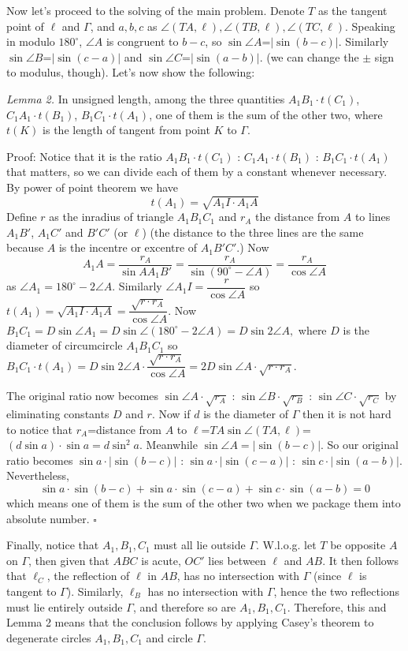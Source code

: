 \documentclass[11pt,a4paper]{article}
\begin{document}
\begin{enumerate}
	Now let's proceed to the solving of the main problem. Denote $T$ as the tangent point of $\ell$ and $\Gamma$, and $a,b,c$ as $\angle (TA,\ell),\angle (TB,\ell),\angle (TC,\ell)$. Speaking in modulo $180^{\circ}$, $\angle A$ is congruent to $b-c$, so $\sin\angle A$=$|\sin (b-c)|$. Similarly $\sin\angle B$=$|\sin (c-a)|$ and $\sin\angle C$=$|\sin (a-b)|.$ (we can change the $\pm$ sign to modulus, though).
	Let's now show the following: 
	
	\emph{Lemma 2.} 
	In unsigned length, 
	among the three quantities 
	$A_1B_1\cdot t(C_1)$, $C_1A_1\cdot t(B_1)$, $B_1C_1\cdot t(A_1)$, 
	one of them is the sum of the other two, 
	where $t(K)$ is the length of tangent from point $K$ to $\Gamma$.
	
	Proof: 
	Notice that it is the ratio $A_1B_1\cdot t(C_1)$ : $C_1A_1\cdot t(B_1)$ : $B_1C_1\cdot t(A_1)$ that matters, so we can divide each of them by a constant whenever necessary.
	By power of point theorem we have 
	\[t(A_1)=\sqrt {A_1I\cdot A_1A}\] 
	Define $r$ as the inradius of triangle $A_1B_1C_1$ and $r_A$ the distance from $A$ to lines $A_1B'$, $A_1C'$ and $B'C'$ (or $\ell$) (the distance to the three lines are the same because $A$ is the incentre or excentre of $A_1B'C'$.)
	Now 
	\[A_1A=\dfrac{r_A}{\sin AA_1B'}=\dfrac{r_A}{\sin (90^{\circ}-\angle A)}=\dfrac{r_A}{\cos \angle A}\]
	as $\angle A_1=180^{\circ}-2\angle A.$ Similarly $\angle A_1I=\dfrac{r}{\cos \angle A}$ so $t(A_1)=\sqrt {A_1I\cdot A_1A}=\dfrac{\sqrt{r\cdot r_A}}{\cos \angle A}$. Now $B_1C_1=D\sin\angle A_1=D\sin\angle (180^{\circ}-2\angle A)=D\sin 2\angle A,$ where $D$ is the diameter of circumcircle $A_1B_1C_1$ so $B_1C_1\cdot t(A_1)=D\sin 2\angle A\cdot \dfrac{\sqrt{r\cdot r_A}}{\cos \angle A}=2D\sin \angle A\cdot\sqrt{r\cdot r_A}.$ 
	
	The original ratio now becomes $\sin \angle A\cdot\sqrt{r_A}$ : $\sin \angle B\cdot\sqrt{r_B}$ : $\sin \angle C\cdot\sqrt{r_C}$ by eliminating constants $D$ and $r$. Now if $d$ is the diameter of $\Gamma$ then it is not hard to notice that $r_A$=distance from $A$ to $\ell$=$TA\sin\angle (TA,\ell)$=$(d\sin a)\cdot\sin a=d\sin^{2} a.$ Meanwhile $\sin\angle A=|\sin (b-c)|.$ So our original ratio becomes $\sin a\cdot|\sin (b-c)|$ : $\sin a\cdot|\sin (c-a)|$ : $\sin c\cdot|\sin (a-b)|$. 
	Nevertheless, 
	\[
	\sin a\cdot\sin (b-c)+\sin a\cdot\sin (c-a)+\sin c\cdot\sin (a-b)=0
	\]
	which means one of them is the sum of the other two when we package them into absolute number. 
	$\square$
	
	Finally, notice that $A_1, B_1, C_1$ must all lie outside $\Gamma$. 
	W.l.o.g. let $T$ be opposite $A$ on $\Gamma$, 
	then given that $ABC$ is acute, 
	$OC'$ lies between $\ell$ and $AB$. 
	It then follows that $\ell_C$, the reflection of $\ell$ in $AB$, 
	has no intersection with $\Gamma$ (since $\ell$ is tangent to $\Gamma$). 
	Similarly, $\ell_B$ has no intersection with $\Gamma$, hence the two reflections 
	must lie entirely outside $\Gamma$, and therefore so are $A_1, B_1, C_1$. 
	Therefore, this and Lemma 2 means that the conclusion follows 
	 by applying Casey's theorem to degenerate circles $A_1, B_1, C_1$ and circle $\Gamma$. 

	
\end{enumerate}
\end{document}
